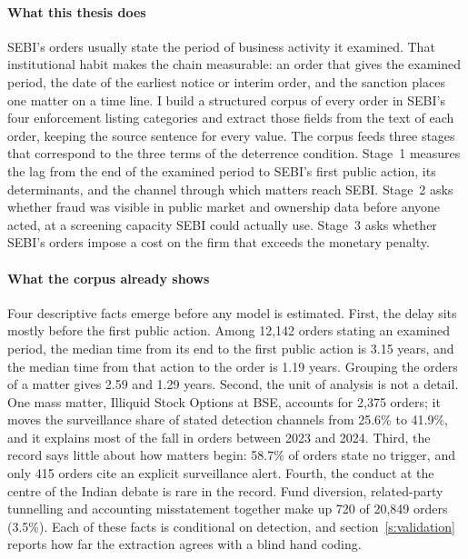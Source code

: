 \documentclass[letterpaper,11pt,leqno]{article}
\begin{document}
\paragraph{What this thesis does} SEBI's orders usually state the period of business activity it examined. That institutional habit makes the chain measurable: an order that gives the examined period, the date of the earliest notice or interim order, and the sanction places one matter on a time line. I build a structured corpus of every order in SEBI's four enforcement listing categories and extract those fields from the text of each order, keeping the source sentence for every value. The corpus feeds three stages that correspond to the three terms of the deterrence condition. Stage~1 measures the lag from the end of the examined period to SEBI's first public action, its determinants, and the channel through which matters reach SEBI. Stage~2 asks whether fraud was visible in public market and ownership data before anyone acted, at a screening capacity SEBI could actually use. Stage~3 asks whether SEBI's orders impose a cost on the firm that exceeds the monetary penalty.

\paragraph{What the corpus already shows} Four descriptive facts emerge before any model is estimated. First, the delay sits mostly before the first public action. Among 12,142 orders stating an examined period, the median time from its end to the first public action is 3.15 years, and the median time from that action to the order is 1.19 years. Grouping the orders of a matter gives 2.59 and 1.29 years. Second, the unit of analysis is not a detail. One mass matter, Illiquid Stock Options at BSE, accounts for 2,375 orders; it moves the surveillance share of stated detection channels from 25.6\% to 41.9\%, and it explains most of the fall in orders between 2023 and 2024. Third, the record says little about how matters begin: 58.7\% of orders state no trigger, and only 415 orders cite an explicit surveillance alert. Fourth, the conduct at the centre of the Indian debate is rare in the record. Fund diversion, related-party tunnelling and accounting misstatement together make up 720 of 20,849 orders (3.5\%). Each of these facts is conditional on detection, and section~\ref{s:validation} reports how far the extraction agrees with a blind hand coding.
\end{document}
